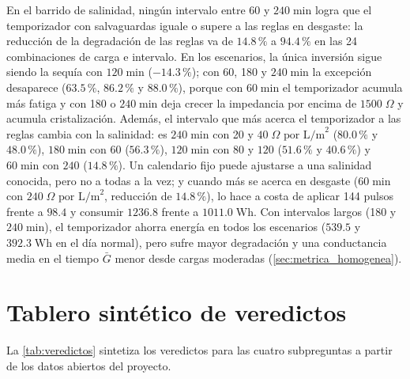 En el barrido de salinidad, ning\'un intervalo entre 60 y $240\;\text{min}$ logra que el temporizador con salvaguardas iguale o supere a las reglas en desgaste: la reducci\'on de la degradaci\'on de las reglas va de $14.8\,\%$ a $94.4\,\%$ en las 24 combinaciones de carga e intervalo. En los escenarios, la \'unica inversi\'on sigue siendo la sequ\'ia con $120\;\text{min}$ ($-14.3\,\%$); con 60, 180 y $240\;\text{min}$ la excepci\'on desaparece ($63.5\,\%$, $86.2\,\%$ y $88.0\,\%$), porque con $60\;\text{min}$ el temporizador acumula m\'as fatiga y con 180 o $240\;\text{min}$ deja crecer la impedancia por encima de $1500\;\Omega$ y acumula cristalizaci\'on. Adem\'as, el intervalo que m\'as acerca el temporizador a las reglas cambia con la salinidad: es $240\;\text{min}$ con 20 y $40\;\Omega\text{ por L/m}^2$ ($80.0\,\%$ y $48.0\,\%$), $180\;\text{min}$ con $60$ ($56.3\,\%$), $120\;\text{min}$ con 80 y $120$ ($51.6\,\%$ y $40.6\,\%$) y $60\;\text{min}$ con $240$ ($14.8\,\%$). Un calendario fijo puede ajustarse a una salinidad conocida, pero no a todas a la vez; y cuando m\'as se acerca en desgaste ($60\;\text{min}$ con $240\;\Omega\text{ por L/m}^2$, reducci\'on de $14.8\,\%$), lo hace a costa de aplicar 144 pulsos frente a $98.4$ y consumir $1236.8$ frente a $1011.0\;\text{Wh}$. Con intervalos largos (180 y $240\;\text{min}$), el temporizador ahorra energ\'ia en todos los escenarios ($539.5$ y $392.3\;\text{Wh}$ en el d\'ia normal), pero sufre mayor degradaci\'on y una conductancia media en el tiempo $\bar{G}$ menor desde cargas moderadas (\cref{sec:metrica_homogenea}).

\section{Tablero sint\'etico de veredictos}
La \cref{tab:veredictos} sintetiza los veredictos para las cuatro subpreguntas a partir de los datos abiertos del proyecto.

